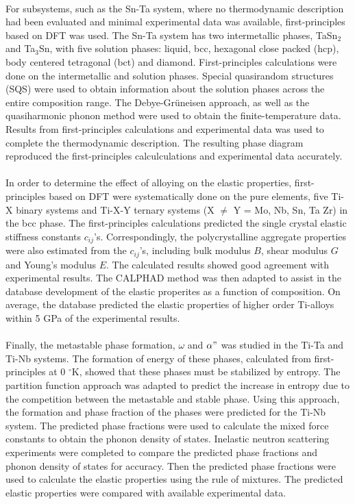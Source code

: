 \paragraph*{} For subsystems, such as the Sn-Ta system, where no thermodynamic description had been evaluated and minimal experimental data was available, first-principles based on DFT was used. The Sn-Ta system has two intermetallic phases, TaSn$_{2}$ and Ta$_{3}$Sn, with five solution phases: liquid, bcc, hexagonal close packed (hcp), body centered tetragonal (bct) and diamond. First-principles calculations were done on the intermetallic and solution phases. Special quasirandom structures (SQS) were used to obtain information about the solution phases across the entire composition range. The Debye-Gr\"uneisen approach, as well as the quasiharmonic phonon method were used to obtain the finite-temperature data. Results from first-principles calculations and experimental data was used to complete the thermodynamic description. The resulting phase diagram reproduced the first-principles calculculations and experimental data accurately.
\paragraph*{}In order to determine the effect of alloying on the elastic properties, first-principles based on DFT were systematically done on the pure elements, five Ti-X binary systems and Ti-X-Y ternary systems (X $\neq $ Y = Mo, Nb, Sn, Ta Zr) in the bcc phase. The first-principles calculations predicted the single crystal elastic stiffness constants $c_{ij}$'s. Correspondingly, the polycrystalline aggregate properties were also estimated from the $c_{ij}$'s, including bulk modulus $B$, shear modulus $G$ and Young's modulus $E$. The calculated results showed good agreement with experimental results. The CALPHAD method was then adapted to assist in the database development of the elastic properites as a function of composition. On average, the database predicted the elastic properties of higher order Ti-alloys within 5 GPa of the experimental results.
\paragraph*{} Finally, the metastable phase formation, $\omega$ and $\alpha"$ was studied in the Ti-Ta and Ti-Nb systems. The formation of energy of these phases, calculated from first-principles at 0 $^\circ$K, showed that these phases must be stabilized by entropy. The partition function approach was adapted to predict the increase in entropy due to the competition between the metastable and stable phase. Using this approach, the formation and phase fraction of the phases were predicted for the Ti-Nb system. The predicted phase fractions were used to calculate the mixed force constants to obtain the phonon density of states. Inelastic neutron scattering experiments were completed to compare the predicted phase fractions and phonon density of states for accuracy. Then the predicted phase fractions were used to calculate the elastic properties using the rule of mixtures. The predicted elastic properties were compared with available experimental data.
